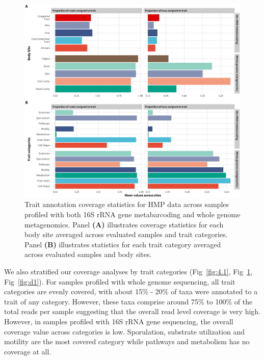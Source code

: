 \begin{figure}[!h]
\includegraphics[width=0.99\linewidth]{figures/ch4_f2.eps}
\caption[Trait annotation coverage statistics for HMP data across samples profiled with both 16S rRNA gene metabarcoding and whole genome metagenomics]{Trait annotation coverage statistics for HMP data across samples profiled with both 16S rRNA gene metabarcoding and whole genome metagenomics. Panel \textbf{(A)} illustrates coverage statistics for each body site averaged across evaluated samples and trait categories. Panel \textbf{(B)} illustrates statistics for each trait category averaged across evaluated samples and body sites.}
\label{fig:4.2}
\end{figure}

We also stratified our coverage analyses by trait categories (Fig~\ref{fig:4.1}, Fig~\ref{fig:4.2}, Fig~\ref{fig:d1}). For samples profiled with whole genome sequencing, all trait categories are evenly covered, with about 15\% - 20\% of taxa were annotated to a trait of any category. However, these taxa comprise around 75\% to 100\% of the total reads per sample suggesting that the overall read level coverage is very high. However, in samples profiled with 16S rRNA gene sequencing, the overall coverage value across categories is low. Sporulation, substrate utilization and motility are the most covered category while pathways and metabolism has no coverage at all.  

